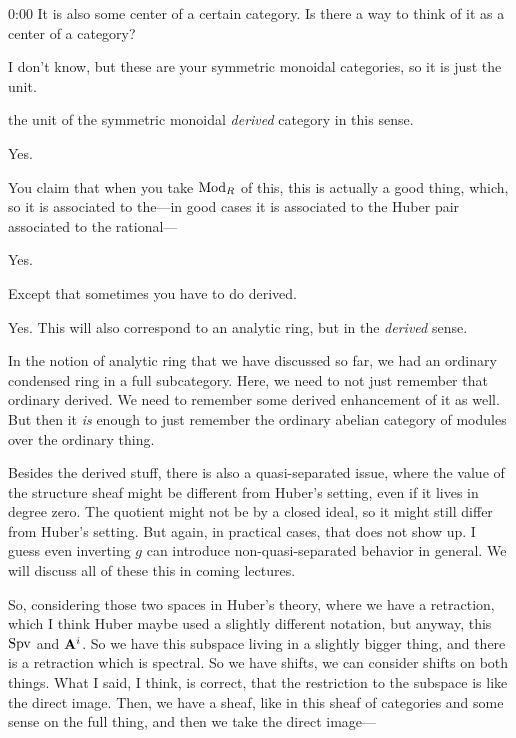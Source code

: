 \begin{unfinished}{0:00}
\ques It is also some center of a certain category. Is there a way to think of it as a center of a category? 

\ans I don't know, but these are your symmetric monoidal categories, so it is just the unit.

\gabber the unit of the symmetric monoidal \emph{derived} category in this sense.

\ans Yes.

\gabber You claim that when you take $\operatorname{Mod}_R$ of this, this is actually a good thing, which, so it is associated to the---in good cases it is associated to the Huber pair associated to the rational---

\ans Yes.

\gabber Except that sometimes you have to do derived. 

\ans Yes. This  will also correspond to an analytic ring, but in the \emph{derived} sense.

In the notion of analytic ring that we have discussed so far, we had an ordinary condensed ring in a full subcategory. Here, we need to not just remember that ordinary derived. We need to remember some derived enhancement of it as well. But then it \emph{is} enough to just remember the ordinary abelian category of modules over the ordinary thing.

Besides the derived stuff, there is also a quasi-separated issue, where the value of the structure sheaf might be different from Huber's setting, even if it lives in degree zero. 
The quotient might not be by a closed ideal, so it might still differ from Huber's setting. But again, in practical cases, that does not show up. I guess even inverting $g$  can introduce non-quasi-separated behavior in general. We will discuss all of these this in coming lectures.

\gabber So, considering those two spaces in Huber's theory, where we have a retraction, which I think Huber maybe used a slightly different notation, but anyway, this $\operatorname{Spv}$ and $\mathbf A^i$. 
So we have this subspace living in a slightly bigger thing, and there is a retraction which is spectral. So we have shifts, we can consider shifts on both things. 
What I said, I think, is correct, that the restriction to the subspace is like the direct image. Then, we have a sheaf, like in this sheaf of categories and some sense on the full thing, and then we take the direct image---


\end{unfinished}
